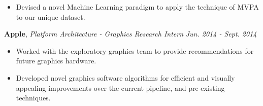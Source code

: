 \documentclass[9pt]{article}
\newenvironment{changemargin}[2]{%
  \begin{list}{}{%
    \setlength{\topsep}{0pt}%
    \setlength{\leftmargin}{#1}%
    \setlength{\rightmargin}{#2}%
    \setlength{\listparindent}{\parindent}%
    \setlength{\itemindent}{\parindent}%
    \setlength{\parsep}{\parskip}%
  }%
  \item[]}{\end{list}
}
\newenvironment{body} {
	\vspace*{-16pt}
	\begin{changemargin}{-0.25in}{-0.5in}
  }	
	{\end{changemargin}
}
\begin{document}
\begin{body}
\begin{itemize}
	\item Devised a novel Machine Learning paradigm to apply the technique of MVPA to our unique dataset.
	\end{itemize}
	\vspace*{-2pt}
	\textbf{Apple}, \emph{Platform Architecture - Graphics Research Intern} \hfill \emph{Jun. 2014 - Sept. 2014}\\
	\vspace*{-3pt}
	\begin{itemize} \itemsep -0pt %
	\item Worked with the exploratory graphics team to provide recommendations for future graphics hardware.
	\item Developed novel graphics software algorithms for efficient and visually appealing improvements over the current pipeline, and pre-existing techniques.
	\end{itemize}

\end{body}
\end{document}
